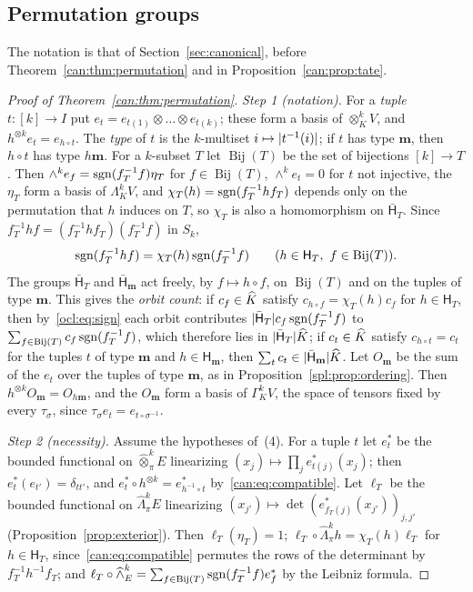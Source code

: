 \subsection{Permutation groups}\label{ocl:ssec:permutations}

The notation is that of Section~\ref{sec:canonical}, before Theorem~\ref{can:thm:permutation} and in
Proposition~\ref{can:prop:tate}.

\begin{proof}[Proof of Theorem~\ref{can:thm:permutation}]
\emph{Step 1 (notation).} For a \emph{tuple} $t\colon[k]\to I$ put $e_t=e_{t(1)}\otimes\dots\otimes e_{t(k)}$; these
form a basis of $\otimes^k_KV$, and $h^{\otimes k}e_t=e_{h\circ t}$. The \emph{type} of $t$ is the $k$-multiset
$i\mapsto\lvert t^{-1}(i)\rvert$; if $t$ has type $\mathbf m$, then $h\circ t$ has type $h\mathbf m$. For a $k$-subset $T$ let
$\operatorname{Bij}(T)$ be the set of bijections $[k]\to T$. Then $\wedge^ke_f=\operatorname{sgn}(f_T^{-1}f)\eta_T$ for
$f\in\operatorname{Bij}(T)$, $\wedge^ke_t=0$ for $t$ not injective, the $\eta_T$ form a basis of $\Lambda^k_KV$, and
$\chi_T(h)=\operatorname{sgn}(f_T^{-1}hf_T)$ depends only on the permutation that $h$ induces on $T$, so $\chi_T$ is also a
homomorphism on $\bar{\mathsf H}_T$. Since $f_T^{-1}hf=(f_T^{-1}hf_T)(f_T^{-1}f)$ in $S_k$,
\begin{equation}\label{ocl:eq:sign}
 \sgn(f_T^{-1}hf)=\chi_T(h)\sgn(f_T^{-1}f)\qquad(h\in\mathsf H_T,\ f\in\operatorname{Bij}(T)).
\end{equation}
The groups $\bar{\mathsf H}_T$ and $\bar{\mathsf H}_{\mathbf m}$ act freely, by $f\mapsto h\circ f$, on
$\operatorname{Bij}(T)$ and on the tuples of type $\mathbf m$. This gives the \emph{orbit count}: if $c_f\in\widehat K$ satisfy
$c_{h\circ f}=\chi_T(h)c_f$ for $h\in\mathsf H_T$, then by~\eqref{ocl:eq:sign} each orbit contributes $\lvert \bar{\mathsf
H}_T\rvert c_f\operatorname{sgn}(f_T^{-1}f)$ to $\sum_{f\in\operatorname{Bij}(T)}c_f\operatorname{sgn}(f_T^{-1}f)$, which therefore lies in
$\lvert \bar{\mathsf H}_T\rvert\widehat K$; if $c_t\in\widehat K$ satisfy $c_{h\circ t}=c_t$ for the tuples $t$ of type $\mathbf m$ and
$h\in\mathsf H_{\mathbf m}$, then $\sum_tc_t\in\lvert \bar{\mathsf H}_{\mathbf m}\rvert\widehat K$. Let $O_{\mathbf m}$ be the sum of
the $e_t$ over the tuples of type $\mathbf m$, as in Proposition~\ref{spl:prop:ordering}. Then $h^{\otimes k}O_{\mathbf
m}=O_{h\mathbf m}$, and the $O_{\mathbf m}$ form a basis of $\Gamma^k_KV$, the space of tensors fixed by every
$\tau_\sigma$, since $\tau_\sigma e_t=e_{t\circ\sigma^{-1}}$.

\emph{Step 2 (necessity).} Assume the hypotheses of~(4). For a tuple $t$ let $e^*_t$ be the bounded functional on
$\widehat\otimes^k_\pi E$ linearizing $(x_j)\mapsto\prod_je^*_{t(j)}(x_j)$; then $e^*_t(e_{t'})=\delta_{tt'}$, and
$e^*_t\circ h^{\otimes k}=e^*_{h^{-1}\circ t}$ by~\eqref{can:eq:compatible}. Let $\ell_T$ be the bounded functional on
$\widehat\Lambda^k_\pi E$ linearizing $(x_{j'})\mapsto\det(e^*_{f_T(j)}(x_{j'}))_{j,j'}$
(Proposition~\ref{prop:exterior}). Then $\ell_T(\eta_T)=1$; $\ell_T\circ\widehat\Lambda^k_\pi h=\chi_T(h)\ell_T$ for
$h\in\mathsf H_T$, since~\eqref{can:eq:compatible} permutes the rows of the determinant by $f_T^{-1}h^{-1}f_T$; and
$\ell_T\circ\widehat\wedge^k_E=\sum_{f\in\operatorname{Bij}(T)}\operatorname{sgn}(f_T^{-1}f)e^*_f$ by the Leibniz formula.


\end{proof}
